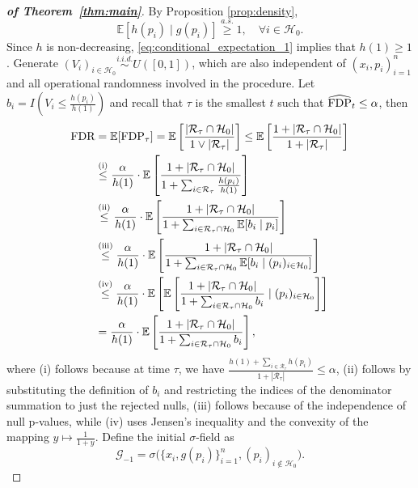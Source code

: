 \documentclass{biometrika}
\newcommand{\cH}{\mathcal{H}}
\newcommand{\cG}{\mathcal{G}}
\newcommand{\cR}{\mathcal{R}}
\newcommand{\hFDP}{\widehat{\textnormal{FDP}}}
\newcommand{\FDP}{\textnormal{FDP}}
\newcommand{\FDR}{\textnormal{FDR}}
\newcommand{\E}{\mathbb{E}}
\newcommand{\1}{\mathbf{1}}
\begin{document}
\begin{proof}[\textbf{of Theorem~\ref{thm:main}}]
\label{sec:proof-thm1}
By Proposition \ref{prop:density}, 
\begin{equation}\label{eq:conditional_expectation_1}
\E[h(p_i)\mid g(p_i)]\stackrel{a.s.}{\ge} 1,\quad \forall i\in \cH_{0}.
\end{equation}
Since $h$ is non-decreasing, \eqref{eq:conditional_expectation_1} implies that $h(1)\ge 1$. Generate $(V_{i})_{i\in \cH_{0}}\stackrel{i.i.d.}{\sim} U([0, 1])$, which are also independent of $(x_{i}, p_{i})_{i=1}^{n}$ and all operational randomness involved in the procedure. Let $b_i = I(V_i\le \frac{h(p_{i})}{h(1)})$ and recall that $\tau$ is the smallest $t$ such that $\hFDP_{t}\le \alpha$, then
\begin{align*}
\FDR & = \E [\FDP_\tau ] = \E\left[ \frac{|\cR_\tau \cap \cH_{0}|}{1\vee |\cR_\tau |}\right]\le \E\left[ \frac{1 + |\cR_\tau \cap \cH_{0}|}{1 + |\cR_\tau |}\right]\\
& \stackrel{(\mathrm{i})}{\le} \frac{\alpha}{h(1)}\cdot \E\left[ \frac{1 + |\cR_\tau \cap \cH_{0}|}{1 + \sum_{i\in \cR_{\tau}}\frac{h(p_{i})}{h(1)}}\right]\\
& \stackrel{(\mathrm{ii})}{\le} \frac{\alpha}{h(1)}\cdot \E\left[ \frac{1 + |\cR_{\tau}\cap \cH_{0}|}{1 + \sum_{i\in \cR_{\tau}\cap\cH_{0}}\E[b_{i} \mid p_{i}]}\right]\\
& \stackrel{(\mathrm{iii})}{\le} \frac{\alpha}{h(1)}\cdot \E\left[ \frac{1 + |\cR_{\tau}\cap \cH_{0}|}{1 + \sum_{i\in \cR_{\tau}\cap\cH_{0}}\E[b_{i} \mid (p_{i})_{i\in \cH_{0}}]}\right]\\
& \stackrel{(\mathrm{iv})}{\le} \frac{\alpha}{h(1)} \cdot \E\left[\E\left[ \frac{1 + |\cR_{\tau}\cap \cH_{0}|}{1 + \sum_{i\in \cR_{\tau}\cap\cH_{0}}b_{i}} \mid (p_{i})_{i\in \cH_{0}}\right]\right]\\
& = \frac{\alpha}{h(1)} \cdot \E\left[ \frac{1 + |\cR_{\tau}\cap \cH_{0}|}{1 + \sum_{i\in \cR_{\tau}\cap\cH_{0}}b_{i}} \right],
\end{align*}
where (i) follows because at time $\tau$, we have $\frac{h(1) + \sum_{i \in \cR_{\tau}} h(p_i)}{1 + |\cR_\tau|} \leq \alpha$, (ii) follows by substituting the definition of $b_i$ and restricting the indices of the denominator summation to just the rejected nulls, (iii) follows because of the independence of null p-values, while (iv) uses Jensen's inequality and the convexity of the mapping $y\mapsto \frac{1}{1 + y}$. Define the initial $\sigma$-field as
\[\cG_{-1} = \sigma\bigg( \{x_{i}, g(p_{i})\}_{i=1}^{n}, (p_{i})_{i\not\in \cH_{0}}\bigg).\]

\end{proof}
\end{document}
